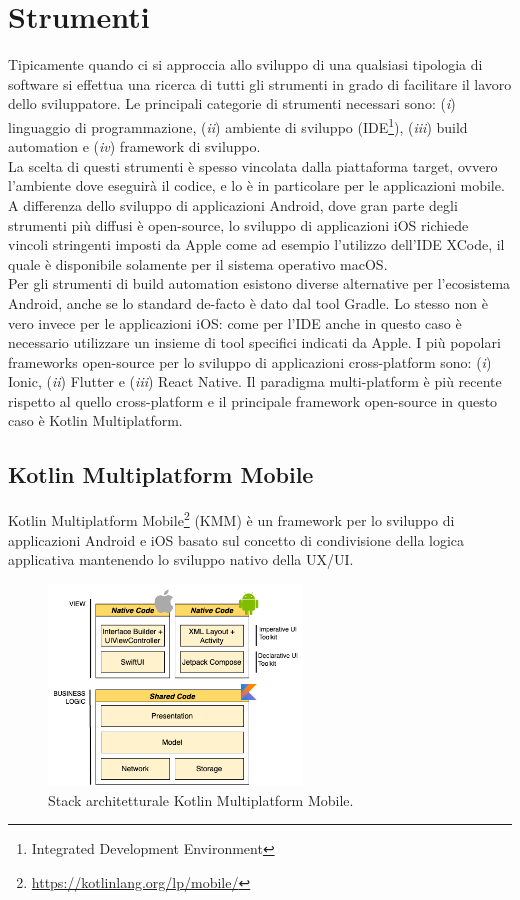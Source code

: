 \section{Strumenti}
Tipicamente quando ci si approccia allo sviluppo di una qualsiasi tipologia di software si effettua una ricerca di tutti gli strumenti in grado di facilitare il lavoro dello sviluppatore. Le principali categorie di strumenti necessari sono: (\textit{i}) linguaggio di programmazione, (\textit{ii}) ambiente di sviluppo (IDE\footnote{Integrated Development Environment}), (\textit{iii}) build automation e (\textit{iv}) framework di sviluppo.\\
La scelta di questi strumenti è spesso vincolata dalla piattaforma target, ovvero l'ambiente dove eseguirà il codice, e lo è in particolare per le applicazioni mobile. A differenza dello sviluppo di applicazioni Android, dove gran parte degli strumenti più diffusi è open-source, lo sviluppo di applicazioni iOS richiede vincoli stringenti imposti da Apple come ad esempio l'utilizzo dell'IDE XCode, il quale è disponibile solamente per il sistema operativo macOS.\\
Per gli strumenti di build automation esistono diverse alternative per l'ecosistema Android, anche se lo standard de-facto è dato dal tool Gradle. Lo stesso non è vero invece per le applicazioni iOS: come per l'IDE anche in questo caso è necessario utilizzare un insieme di tool specifici indicati da Apple.
I più popolari frameworks open-source per lo sviluppo di applicazioni cross-platform sono: (\textit{i}) Ionic, (\textit{ii}) Flutter e (\textit{iii}) React Native. Il paradigma multi-platform è più recente rispetto al quello cross-platform e il principale framework open-source in questo caso è Kotlin Multiplatform.

\subsection{Kotlin Multiplatform Mobile}
Kotlin Multiplatform Mobile\footnote{\href{https://kotlinlang.org/lp/mobile/}{https://kotlinlang.org/lp/mobile/}} (KMM) è un framework per lo sviluppo di applicazioni Android e iOS basato sul concetto di condivisione della logica applicativa mantenendo lo sviluppo nativo della UX/UI.

\begin{figure}[H]
    \centering
    \includegraphics[width=0.6\textwidth]{img/stack_kmm.png}
    \caption{Stack architetturale Kotlin Multiplatform Mobile.}
    \label{stackKMM}
\end{figure}

